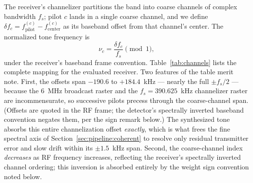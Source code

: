 The receiver's channelizer partitions the band into coarse channels of complex bandwidth $f_s$; pilot $c$ lands in a single coarse channel, and we define $\delta\!f_c = f_{\text{pilot}}^{(c)} - f_{\text{center}}^{(c)}$ as its baseband offset from that channel's center. The normalized tone frequency is
\begin{equation}
\nu_c = \frac{\delta\!f_c}{f_s} \pmod 1,
\end{equation}
under the receiver's baseband frame convention. Table~\ref{tab:channels} lists the complete mapping for the evaluated receiver. Two features of the table merit note. First, the offsets span $-190.6$ to $+184.4$~kHz --- nearly the full $\pm f_s/2$ --- because the 6~MHz broadcast raster and the $f_s = 390.625$~kHz channelizer raster are incommensurate, so successive pilots precess through the coarse-channel span. (Offsets are quoted in the RF frame; the detector's spectrally inverted baseband convention negates them, per the sign remark below.) The synthesized tone absorbs this entire channelization offset \emph{exactly}, which is what frees the fine spectral axis of Section~\ref{sec:pipeline:coherent} to resolve only residual transmitter error and slow drift within its $\pm 1.5$~kHz span. Second, the coarse-channel index \emph{decreases} as RF frequency increases, reflecting the receiver's spectrally inverted channel ordering; this inversion is absorbed entirely by the weight sign convention noted below.

